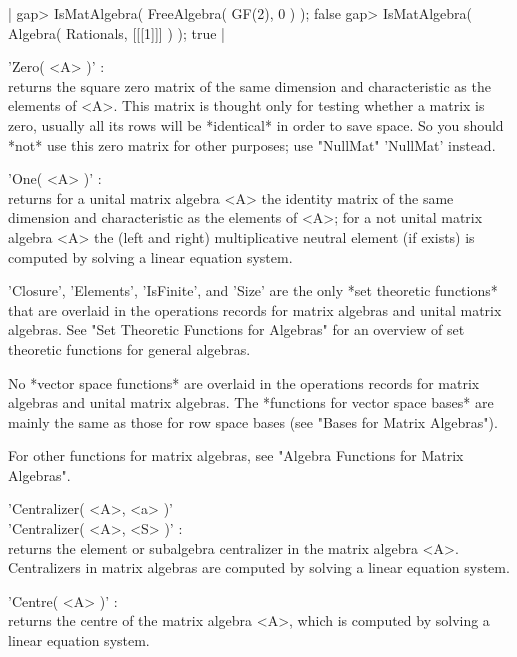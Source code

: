 |    gap> IsMatAlgebra( FreeAlgebra( GF(2), 0 ) );
    false
    gap> IsMatAlgebra( Algebra( Rationals, [[[1]]] ) );
    true |


'Zero( <A> )' : \\
    returns the square zero matrix of the same dimension and
    characteristic as the elements of <A>.  This matrix is thought only
    for testing whether a matrix is zero, usually all its rows will be
    *identical* in order to save space.  So you should *not* use this
    zero matrix for other purposes; use "NullMat" 'NullMat' instead.

'One( <A> )' : \\
    returns for a unital matrix algebra <A> the identity matrix of the
    same dimension and characteristic as the elements of <A>; for a not
    unital matrix algebra <A> the (left and right) multiplicative
    neutral element (if exists) is computed by solving a linear equation
    system.


'Closure', 'Elements', 'IsFinite', and 'Size' are the only *set theoretic
functions* that are overlaid in the operations records for matrix
algebras and unital matrix algebras.
See "Set Theoretic Functions for Algebras" for an overview of set
theoretic functions for general algebras.

No *vector space functions* are overlaid in the operations records for
matrix algebras and unital matrix algebras.
The *functions for vector space bases* are mainly the same as those for
row space bases (see "Bases for Matrix Algebras").

For other functions for matrix algebras, see "Algebra Functions for
Matrix Algebras".


'Centralizer( <A>, <a> )' \\
'Centralizer( <A>, <S> )' : \\
    returns the element or subalgebra centralizer in the matrix algebra
    <A>.  Centralizers in matrix algebras are computed by solving a
    linear equation system.

'Centre( <A> )' : \\
    returns the centre of the matrix algebra <A>, which is computed by
    solving a linear equation system.

